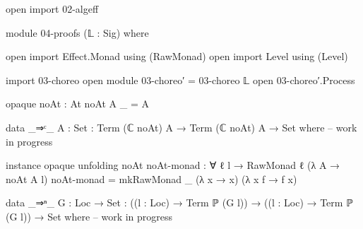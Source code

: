 

\begin{code}[hide]
open import 02-algeff

module 04-proofs (𝕃 : Sig) where

open import Effect.Monad using (RawMonad)
open import Level using (Level)

import 03-choreo
open module 03-choreo′ = 03-choreo 𝕃
open 03-choreo′.Process
\end{code}


%
\begin{center}\begin{code}[hide]
opaque
  noAt : At
  noAt A _ = A

data _⇒ᶜ_ {A : Set} : Term (ℂ noAt) A → Term (ℂ noAt) A → Set where
-- work in progress
\end{code}\end{center}
\begin{code}[hide]
instance
  opaque
    unfolding noAt
    noAt-monad : ∀ {ℓ} {l} → RawMonad {ℓ} (λ A → noAt A l)
    noAt-monad = mkRawMonad _ (λ x → x) (λ x f → f x)
\end{code}
%
%
\begin{center}\begin{code}[hide]
data _⇒ⁿ_ {G : Loc → Set} :
  ((l : Loc) → Term ℙ (G l)) → ((l : Loc) → Term ℙ (G l)) → Set where
-- work in progress
\end{code}\end{center}
%


